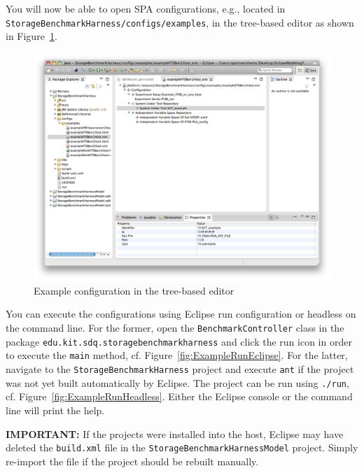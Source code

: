 You will now be able to open SPA configurations, e.g., located in \texttt{StorageBenchmarkHarness/configs/examples}, in the tree-based editor as shown in Figure~\ref{fig:ExampleConfiguration}. 

\begin{figure}[htbp]
	\centering
	\includegraphics[scale=0.375]{graphics/example/Configuration.png}
	\caption{Example configuration in the tree-based editor}
 	\label{fig:ExampleConfiguration}
\end{figure}

You can execute the configurations using Eclipse run configuration or headless on the command line. For the former, open the \texttt{BenchmarkController} class in the package \texttt{edu.kit.sdq.storagebenchmarkharness} and click the run icon in order to execute the \texttt{main} method, cf. Figure~\ref{fig:ExampleRunEclipse}. For the latter, navigate to the \texttt{StorageBenchmarkHarness} project and execute \texttt{ant} if the project was not yet built automatically by Eclipse. The project can be run using \texttt{./run}, cf. Figure~\ref{fig:ExampleRunHeadless}. Either the Eclipse console or the command line will print the help.

\textbf{IMPORTANT:} If the projects were installed into the host, Eclipse may have deleted the \texttt{build.xml} file in the \texttt{StorageBenchmarkHarnessModel} project. Simply re-import the file if the project should be rebuilt manually.

